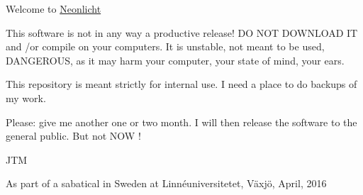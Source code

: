 Welcome to \hyperlink{classNeonlicht}{Neonlicht}

This software is not in any way a productive release! D\-O N\-O\-T D\-O\-W\-N\-L\-O\-A\-D I\-T and /or compile on your computers. It is unstable, not meant to be used, D\-A\-N\-G\-E\-R\-O\-U\-S, as it may harm your computer, your state of mind, your ears.

This repository is meant strictly for internal use. I need a place to do backups of my work.

Please\-: give me another one or two month. I will then release the software to the general public. But not N\-O\-W !

J\-T\-M

As part of a sabatical in Sweden at Linnéuniversitetet, Växjö, April, 2016 